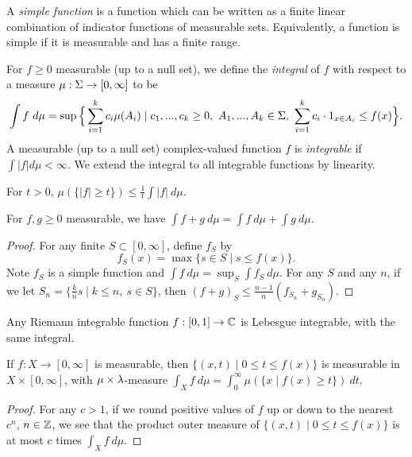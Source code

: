 \begin{defn} A \emph{simple function} is a function which can be written as a finite linear combination of indicator functions of measurable sets. Equivalently, a function is simple if it is measurable and has a finite range.
\end{defn}

\begin{defn} For $f \ge 0$ measurable (up to a null set), we define the \emph{integral} of $f$ with respect to a measure $\mu:\Sigma\rightarrow [0,\infty]$ to be
\[
\int f\ d\mu = \sup\Big\{\sum_{i = 1}^k c_i\mu(A_i) \mid c_1, ..., c_k \ge 0,\ A_1, ..., A_k \in \Sigma,\ \sum_{i=1}^k c_i\cdot 1_{x \in A_i} \le f(x)\Big\}.
\]
A measurable (up to a null set) complex-valued function $f$ is \emph{integrable} if $\int |f| d\mu < \infty$. We extend the integral to all integrable functions by linearity.
\end{defn}

\begin{thm}\label{markov} For $t > 0$, $\mu(\{|f| \ge t\}) \le \frac{1}{t}\int |f|\ d\mu$.
\end{thm}

\begin{prop} For $f,g \ge 0$ measurable, we have $\int f+g\ d\mu = \int f\ d\mu + \int g\ d\mu$.
\end{prop}
\begin{proof} For any finite $S \subset [0,\infty]$, define $f_S$ by
\[
f_S(x) = \max \{s \in S \mid s \le f(x)\}.
\]
Note $f_S$ is a simple function and $\int f\ d\mu = \sup_S \int f_S\ d\mu$. For any $S$ and any $n$, if we let $S_n = \{\frac{k}{n}s\mid k \le n,\ s\in S\}$, then $(f+g)_S \le \frac{n-1}{n}(f_{S_n}+g_{S_n})$.
\end{proof}

\begin{prop} Any Riemann integrable function $f:[0,1] \rightarrow \mathbb{C}$ is Lebesgue integrable, with the same integral.
\end{prop}

\begin{prop} If $f:X \rightarrow [0,\infty]$ is measurable, then $\{(x,t) \mid 0 \le t \le f(x)\}$ is measurable in $X\times [0,\infty]$, with $\mu\times\lambda$-measure $\int_X f\ d\mu = \int_0^\infty \mu(\{x \mid f(x) \ge t\})\ dt$.
\end{prop}
\begin{proof} For any $c > 1$, if we round positive values of $f$ up or down to the nearest $c^n$, $n \in \mathbb{Z}$, we see that the product outer measure of $\{(x,t) \mid 0 \le t \le f(x)\}$ is at most $c$ times $\int_X f\ d\mu$.
\end{proof}

